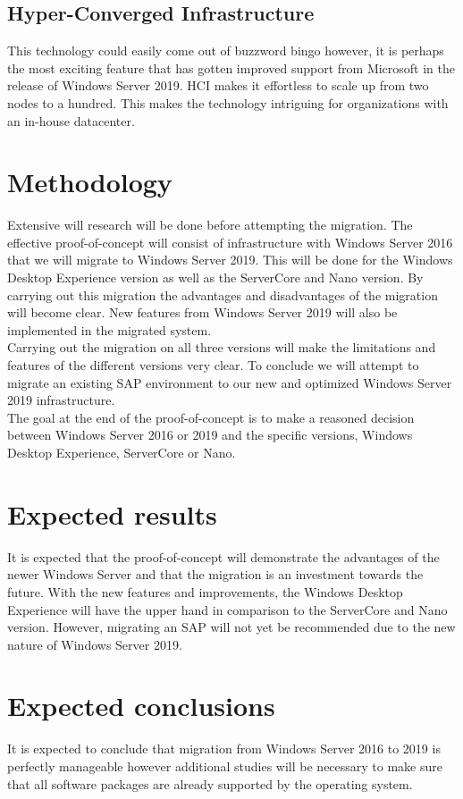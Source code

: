 \subsection{Hyper-Converged Infrastructure}
This technology could easily come out of buzzword bingo however, it is perhaps the most exciting feature that has gotten improved support from Microsoft in the release of Windows Server 2019. HCI makes it effortless to scale up from two nodes to a hundred. This makes the technology intriguing for organizations with an in-house datacenter.
\section{Methodology}\label{sec:methodology}
Extensive will research will be done before attempting the migration. The effective proof-of-concept will consist of infrastructure with Windows Server 2016 that we will migrate to Windows Server 2019. This will be done for the Windows Desktop Experience version as well as the ServerCore and Nano version. By carrying out this migration the advantages and disadvantages of the migration will become clear. New features from Windows Server 2019 will also be implemented in the migrated system. 
\\
Carrying out the migration on all three versions will make the limitations and features of the different versions very clear. 
To conclude we will attempt to migrate an existing SAP environment to our new and optimized Windows Server 2019 infrastructure.
\\
The goal at the end of the proof-of-concept is to make a reasoned decision between Windows Server 2016 or 2019 and the specific versions, Windows Desktop Experience, ServerCore or Nano.
\section{Expected results}\label{sec:anticipated_results}
It is expected that the proof-of-concept will demonstrate the advantages of the newer Windows Server and that the migration is an investment towards the future. With the new features and improvements, the Windows Desktop Experience will have the upper hand in comparison to the ServerCore and Nano version. However, migrating an SAP will not yet be recommended due to the new nature of Windows Server 2019. 
\section{Expected conclusions}\label{sec:anticipated_conclusions}
It is expected to conclude that migration from Windows Server 2016 to 2019 is perfectly manageable however additional studies will be necessary to make sure that all software packages are already supported by the operating system.